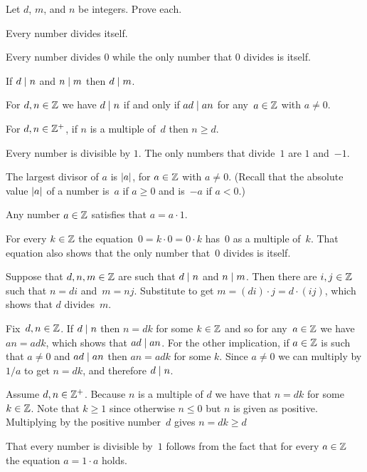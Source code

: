 \documentclass{ibl}
\begin{document}
\begin{ex}
Let $d$, $m$, and $n$ be integers.
Prove each.
\begin{exes}
\item {} Every number divides itself.
\item Every number divides $0$ while
  the only number that $0$ divides is itself.
\item {} If $d\mid n$ and $n\mid m$ 
   then $d\mid m$.
\item {} 
  For $d,n\in\mathbb{Z}$ we have $d\mid n$ if and only if 
  $ad\mid an$ for any~$a\in\mathbb{Z}$ with $a\neq 0$.
\item {} 
  For $d,n\in\mathbb{Z}^+$, if $n$ is a multiple of~$d$ then $n\geq d$.
\item Every number is divisible by $1$.
  The only numbers that divide~$1$ are $1$ and~$-1$.
\item The largest divisor of $a$ is $\lvert a\rvert$, for $a\in\mathbb{Z}$ with $a\neq 0$.
  (Recall that the absolute value  $\lvert a\rvert$ of a number is~$a$ 
  if $a\geq 0$ and is~$-a$ if $a<0$.) 
\end{exes}
\begin{ans}
\begin{exes}
\item Any number $a\in\mathbb{Z}$ satisfies that $a=a\cdot 1$.
\item For every $k\in\mathbb{Z}$ the equation~$0=k\cdot 0=0\cdot k$ has~$0$ 
  as a multiple of~$k$.
  That equation also shows that the only number that~$0$ divides is itself. 
\item Suppose that $d, n, m\in\mathbb{Z}$ are such that $d\mid n$ and
  $n\mid m$.
  Then there are $i,j\in\mathbb{Z}$ such that $n=di$ and~$m=nj$.
  Substitute to get $m=(di)\cdot j=d\cdot(ij)$, which shows that
  $d$ divides~$m$.
\item Fix~$d,n\in\mathbb{Z}$.
  If $d\mid n$ then $n=dk$ for some $k\in\mathbb{Z}$ and so for any~$a\in\mathbb{Z}$
  we have $an=adk$, which shows that $ad\mid an$.
  For the other implication, if $a\in\mathbb{Z}$ is such that $a\neq 0$ and
  $ad\mid an$ then $an=adk$ for some  $k$.
  Since $a\neq 0$ we can multiply by $1/a$ to get $n=dk$, and therefore
  $d\mid n$.
\item Assume $d,n\in\mathbb{Z}^+$.
  Because $n$ is a multiple of $d$ we have that $n=dk$ for some $k\in\mathbb{Z}$.
  Note that $k\geq 1$ since otherwise $n\leq 0$ but $n$ is given as positive.  
  Multiplying by the positive number~$d$ gives $n=dk\geq d$ 
\item That every number is divisible by~$1$ follows from the fact that
   for every $a\in\mathbb{Z}$ the equation $a=1\cdot a$ holds.


\end{exes}
\end{ans}
\end{ex}
\end{document}
